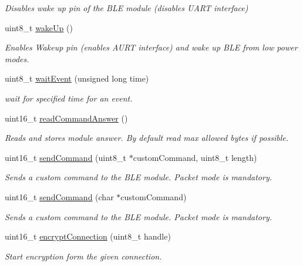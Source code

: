 \begin{DoxyCompactItemize}
\begin{DoxyCompactList}\small\item\em Disables wake up pin of the B\+LE module (disables U\+A\+RT interface) \end{DoxyCompactList}\item 
uint8\+\_\+t \hyperlink{class_wasp_b_l_e_af500af76e412634231a0640975940b6a}{wake\+Up} ()
\begin{DoxyCompactList}\small\item\em Enables Wakeup pin (enables A\+U\+RT interface) and wake up B\+LE from low power modes. \end{DoxyCompactList}\item 
uint8\+\_\+t \hyperlink{class_wasp_b_l_e_adca5a576b3b798898909183aadeae0ae}{wait\+Event} (unsigned long time)
\begin{DoxyCompactList}\small\item\em wait for specified time for an event. \end{DoxyCompactList}\item 
uint16\+\_\+t \hyperlink{class_wasp_b_l_e_a6267dcaa94ac41a1f9baccc048b497a7}{read\+Command\+Answer} ()
\begin{DoxyCompactList}\small\item\em Reads and stores module answer. By default read max allowed bytes if possible. \end{DoxyCompactList}\item 
uint16\+\_\+t \hyperlink{class_wasp_b_l_e_aa641a53b3d4e466a5aba6005f72cea02}{send\+Command} (uint8\+\_\+t $\ast$custom\+Command, uint8\+\_\+t length)
\begin{DoxyCompactList}\small\item\em Sends a custom command to the B\+LE module. Packet mode is mandatory. \end{DoxyCompactList}\item 
uint16\+\_\+t \hyperlink{class_wasp_b_l_e_ae0b129b7917ad5073ee53f18688cb209}{send\+Command} (char $\ast$custom\+Command)
\begin{DoxyCompactList}\small\item\em Sends a custom command to the B\+LE module. Packet mode is mandatory. \end{DoxyCompactList}\item 
uint16\+\_\+t \hyperlink{class_wasp_b_l_e_afbc174be157fe298a92bfabb0099ec15}{encrypt\+Connection} (uint8\+\_\+t handle)
\begin{DoxyCompactList}\small\item\em Start encryption form the given connection. \end{DoxyCompactList}\item 

\end{DoxyCompactItemize}
